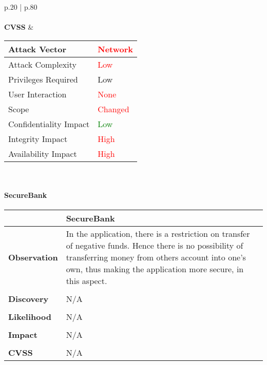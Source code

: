 \begin{longtable*}{p{.20\textwidth} | p{.80\textwidth}}
    \\\\
    \textbf{CVSS} &
      \begin{tabular}{| l | l |}
           \hline
           Attack Vector		& \textcolor{red}{Network}\\
           \hline
           Attack Complexity	& \textcolor{red}{Low} \\
           \hline
           Privileges Required & \textcolor{BurntOrange}{Low} \\
           \hline
           User Interaction	& \textcolor{red}{None} \\
           \hline
           Scope		& \textcolor{red}{Changed} \\
           \hline
           Confidentiality Impact	& \textcolor{Green}{Low} \\
           \hline
           Integrity Impact		& \textcolor{red}{High} \\
           \hline
           Availability Impact		& \textcolor{red}{High} \\
           \hline
           \end{tabular}
    \\
    \hline
\end{longtable*}
\paragraph{SecureBank} \mbox{}
\begin{longtable*}{p{.20\textwidth} | p{.80\textwidth}}
    \hline
    & \textbf{SecureBank} \\
    \hline
    \textbf{Observation} &
       In the application, there is a restriction on transfer of negative funds. Hence there is no possibility of transferring money from others account into one's own, thus making the application more secure, in this aspect.
    \\\\
    \textbf{Discovery} &
    N/A
    \\\\
    \textbf{Likelihood} &
     N/A
    \\\\
    \textbf{Impact} &
      N/A
    \\\\
    \textbf{CVSS} &
    N/A
    \\
    \hline
\end{longtable*}
\clearpage